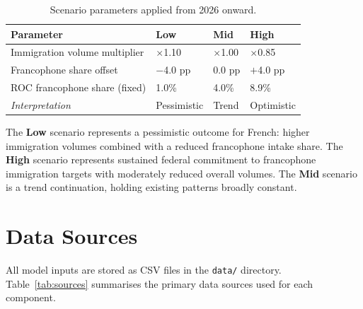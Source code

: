 \documentclass[11pt,a4paper]{article}
\begin{document}
\begin{table}[H]
\centering
\caption{Scenario parameters applied from 2026 onward.}
\label{tab:scenarios}
\vspace{4pt}
\begin{tabular}{L{5.5cm} C{2.5cm} C{2.5cm} C{2.5cm}}
\toprule
\textbf{Parameter} & \textbf{Low} & \textbf{Mid} & \textbf{High} \\
\midrule
Immigration volume multiplier & $\times$1.10 & $\times$1.00 & $\times$0.85 \\
Francophone share offset & $-$4.0 pp & 0.0 pp & $+$4.0 pp \\
ROC francophone share (fixed) & 1.0\% & 4.0\% & 8.9\% \\
\midrule
\textit{Interpretation} & Pessimistic & Trend & Optimistic \\
\bottomrule
\end{tabular}
\end{table}

The \textbf{Low} scenario represents a pessimistic outcome for French: higher
immigration volumes combined with a reduced francophone intake share.  The
\textbf{High} scenario represents sustained federal commitment to francophone
immigration targets with moderately reduced overall volumes.  The \textbf{Mid}
scenario is a trend continuation, holding existing patterns broadly constant.


\section{Data Sources}

All model inputs are stored as CSV files in the \texttt{data/} directory.
Table~\ref{tab:sources} summarises the primary data sources used for each
component.
\end{document}
